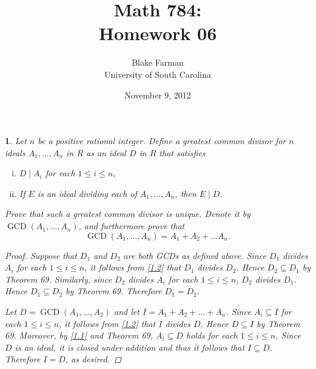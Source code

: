 \documentclass[10pt]{amsart}
\author{Blake Farman\\University of South Carolina}
\title{Math 784:\\Homework 06}
\date{November 9, 2012}
\newcommand{\GCD}[1]{\operatorname{GCD}\left( #1 \right)}
\begin{document}
\maketitle

\newtheorem{thm}{}

\begin{thm}
	Let $n$ be a positive rational integer.
	Define a greatest common divisor for $n$ ideals $A_1, \ldots, A_n$ in $R$ as an ideal $D$ in $R$ that satisfies
	\begin{enumerate}[(i)]
		\item\label{1.1}
			$D \mid A_i$ for each $1 \leq i \leq n$,
		\item\label{1.2}
			If $E$ is an ideal dividing each of $A_1, \ldots, A_n$, then $E \mid D$.
	\end{enumerate}
	Prove that such a greatest common divisor is unique.
	Denote it by $\GCD{A_1, \ldots, A_n}$, and furthermore prove that
		$$\GCD{A_1, \ldots, A_n} = A_1 + A_2 + \ldots A_n.$$
	\begin{proof}
	Suppose that $D_1$ and $D_2$ are both GCDs as defined above.
	Since $D_1$ divides $A_i$ for each $1 \leq i \leq n$, it follows from \eqref{1.2} that $D_1$ divides $D_2$.
	Hence $D_2 \subseteq D_1$ by Theorem 69.
	Similarly, since $D_2$ divides $A_i$ for each $1 \leq i \leq n$, $D_2$ divides $D_1$.
	Hence $D_1 \subseteq D_2$ by Theorem 69.
	Therefore $D_1 = D_2$.
	
	Let $D = \GCD{A_1, \ldots, A_2}$ and let $I = A_1 + A_2 + \ldots + A_n$.
	Since $A_i \subseteq I$ for each $1 \leq i \leq n$, it follows from \eqref{1.2} that $I$ divides $D$.
	Hence $D \subseteq I$ by Theorem 69.
	Moreover, by \eqref{1.1} and Theorem 69, $A_i \subseteq D$ holds for each $1 \leq i \leq n$.
	Since $D$ is an ideal, it is closed under addition and thus it follows that $I \subseteq D$.
	Therefore $I = D$, as desired.
	\end{proof}
\end{thm}
\end{document}
